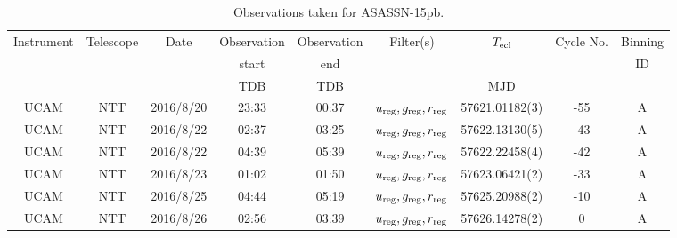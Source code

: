 \begin{table}
	\begin{center}
		\caption{Observations taken for ASASSN-15pb.}
		\label{table:observing:observation logs ASASSN-15pb}
		\begin{tabular}{ccccccccc}
			\hline
			Instrument & Telescope & Date & Observation  & Observation  & Filter(s) & $T_{\rm ecl}$ & Cycle No. & Binning \\
			 &  &  &  start &  end &  &  &  & ID \\
			 &  &  & TDB & TDB &  & MJD &  &  \\
			\hline
			\hline
			UCAM & NTT & 2016/8/20 & 23:33 & 00:37 & $u_{\rm reg},g_{\rm reg},r_{\rm reg}$ & 57621.01182(3) & -55 & A \\
			UCAM & NTT & 2016/8/22 & 02:37 & 03:25 & $u_{\rm reg},g_{\rm reg},r_{\rm reg}$ & 57622.13130(5) & -43 & A \\
			UCAM & NTT & 2016/8/22 & 04:39 & 05:39 & $u_{\rm reg},g_{\rm reg},r_{\rm reg}$ & 57622.22458(4) & -42 & A \\
			UCAM & NTT & 2016/8/23 & 01:02 & 01:50 & $u_{\rm reg},g_{\rm reg},r_{\rm reg}$ & 57623.06421(2) & -33 & A \\
			UCAM & NTT & 2016/8/25 & 04:44 & 05:19 & $u_{\rm reg},g_{\rm reg},r_{\rm reg}$ & 57625.20988(2) & -10 & A \\
			UCAM & NTT & 2016/8/26 & 02:56 & 03:39 & $u_{\rm reg},g_{\rm reg},r_{\rm reg}$ & 57626.14278(2) &   0 & A \\
		   \hline
		\end{tabular}
	\end{center}
\end{table}